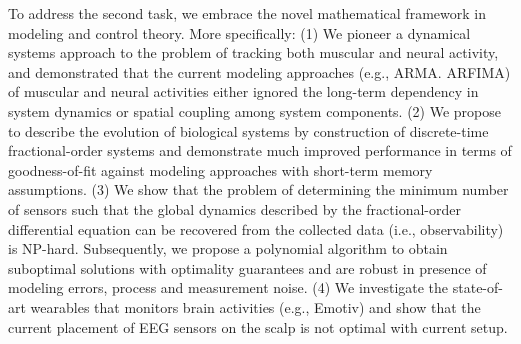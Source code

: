  To address the second task, we embrace the novel mathematical framework in modeling and control theory. More specifically: (1) We pioneer a dynamical systems approach to the problem of tracking both muscular and neural activity, and demonstrated that the current modeling approaches (e.g., ARMA. ARFIMA) of muscular and neural activities either ignored the long-term dependency in system dynamics or spatial coupling among system components. (2) We propose to describe the evolution of biological systems by construction of discrete-time fractional-order systems and demonstrate much improved performance in terms of goodness-of-fit against modeling approaches with short-term memory assumptions. (3) We show that the problem of determining the minimum number of sensors such that the global dynamics described by the fractional-order differential equation can be recovered from the collected data (i.e., observability) is NP-hard. Subsequently, we propose a polynomial algorithm to obtain suboptimal solutions with optimality guarantees and are robust in presence of modeling errors, process and measurement noise. (4) We investigate the state-of-art wearables that monitors brain activities (e.g., Emotiv) and show that the current placement of EEG sensors on the scalp is not optimal with current setup.

